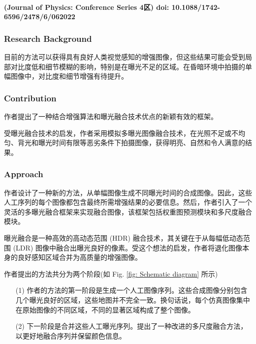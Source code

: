 \documentclass[a4paper, 10pt]{article}
\begin{document}
		\paragraph{(Journal of Physics: Conference Series 4区) doi: 10.1088/1742-6596/2478/6/062022}
		
			\subsubsection{Research Background}
			
			目前的方法可以获得具有良好人类视觉感知的增强图像，但这些结果可能会受到局部对比度低和细节模糊的影响，特别是在曝光不足的区域。在昏暗环境中拍摄的单幅图像中，对比度和细节增强有待提升。
			
			\subsubsection{Contribution}
			
			作者提出了一种结合增强算法和曝光融合技术优点的新颖有效的框架。
			
			受曝光融合技术的启发，作者采用模拟多曝光图像融合技术，在光照不足或不均匀、背光和曝光时间有限等恶劣条件下拍摄图像，获得明亮、自然和令人满意的结果。
			
			\subsubsection{Approach}
			
			作者设计了一种新的方法，从单幅图像生成不同曝光时间的合成图像。因此，这些人工序列的每个图像都包含最终所需增强结果的必要信息。然后，作者引入了一个灵活的多曝光融合框架来实现融合图像，该框架包括权重图预测模块和多尺度融合模块。
						
			曝光融合是一种高效的高动态范围 (HDR) 融合技术，其关键在于从每幅低动态范围 (LDR) 图像中融合出曝光良好的像素。受这个想法的启发，作者将退化图像本身的良好感知区域合并为高质量的增强图像。
			
			作者提出的方法共分为两个阶段(如 Fig. \ref{fig: Schematic diagram} 所示)
			
			\begin{itemize}
				\item[(1)] 
				作者的方法的第一阶段是生成一个人工图像序列。这些合成图像分别包含几个曝光良好的区域，这些地图并不完全一致。换句话说，每个仿真图像集中在原始图像的不同区域，不同的显著区域构成了整个图像。
				
				\item[(2)]
				下一阶段是合并这些人工曝光序列。提出了一种改进的多尺度融合方法，以更好地融合序列并保留颜色信息。
			\end{itemize}	
			
\end{document}
